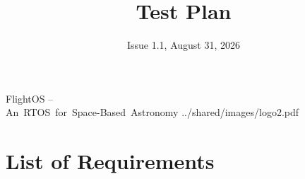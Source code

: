 

\title{Test Plan}
\def \documentid {FLIGHTOS-UVIE-TP-001}
\date{Issue 1.1, August 31, 2026}

\newcommand\affil[1]{\textsuperscript#1}

\def\preparedby {Armin Luntzer\affil{1}}
\def\checkedby {Roland Ottensamer\affil{1}}
\def\approvedby {Franz Kerschbaum\affil{1}}
\def\authorisedby{-}

\def\affiliations{
	\affil{1} Department of Astrophysics, University of Vienna
}









\usepackage{vhistory}

\usepackage[
	backend=biber,
	defernumbers,
	natbib=true,
	style=numeric, %
	sorting=none,
]{biblatex}


%


\rereadauxrequirementlabels

\exportrequirements




\setmainfont{MyriadPro-SemiCondensed}
\uvietitlepage%
{FlightOS --\\\mbox{An RTOS for Space-Based Astronomy}}%
{\doctitle}%
{../shared/images/logo2.pdf}{}
\setmainfont{MyriadPro}

\approvalpage

\tableofcontents
\newpage


\chapter*{List of Requirements}
\the\requirementlist


\begin{versionhistory}
\end{versionhistory}


